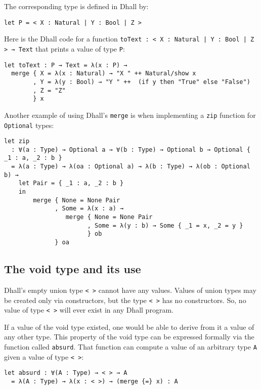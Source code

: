 The corresponding type is defined in Dhall by:


\begin{lstlisting}[language=Dhall]
let P = < X : Natural | Y : Bool | Z >
\end{lstlisting}


Here is the Dhall code for a function \lstinline!toText : < X : Natural | Y : Bool | Z > → Text! that prints a value of type \lstinline!P!:


\begin{lstlisting}[language=Dhall]
let toText : P → Text = λ(x : P) →
  merge { X = λ(x : Natural) → "X " ++ Natural/show x
        , Y = λ(y : Bool) → "Y " ++  (if y then "True" else "False")
        , Z = "Z"
        } x
\end{lstlisting}


Another example of using Dhall's \lstinline!merge! is when implementing a \lstinline!zip! function for \lstinline!Optional! types:


\begin{lstlisting}[language=Dhall]
let zip
  : ∀(a : Type) → Optional a → ∀(b : Type) → Optional b → Optional { _1 : a, _2 : b }
  = λ(a : Type) → λ(oa : Optional a) → λ(b : Type) → λ(ob : Optional b) →
    let Pair = { _1 : a, _2 : b }
    in
        merge { None = None Pair
              , Some = λ(x : a) →
                 merge { None = None Pair
                       , Some = λ(y : b) → Some { _1 = x, _2 = y }
                       } ob 
              } oa
\end{lstlisting}


\subsection{The void type and its use}


Dhall's empty union type \lstinline!< >! cannot have any values.
Values of union types may be created only via constructors, but the type \lstinline!< >! has no constructors.
So, no value of type \lstinline!< >! will ever exist in any Dhall program.


If a value of the void type existed, one would be able to derive from it a value of any other type.
This property of the void type can be expressed formally via the function called \lstinline!absurd!.
That function can compute a value of an arbitrary type \lstinline!A! given a value of type \lstinline!< >!:


\begin{lstlisting}[language=Dhall]
let absurd : ∀(A : Type) → < > → A
  = λ(A : Type) → λ(x : < >) → (merge {=} x) : A 
\end{lstlisting}



